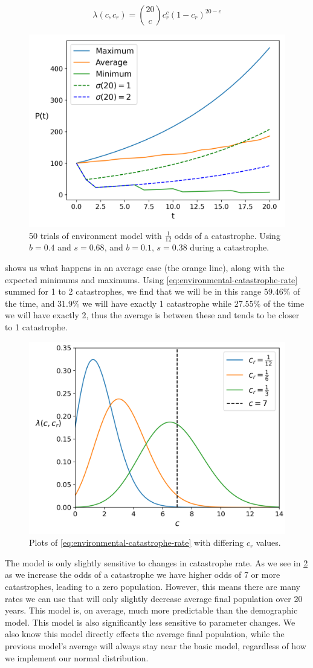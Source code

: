 \documentclass{article}
\begin{document}
\begin{equation} \label{eq:environmental-catastrophe-rate}
    \lambda(c, c_r) = \binom{20}{c} c_r^c (1-c_r)^{20-c}
\end{equation}

\begin{figure}[h!]
    \centering
    \includegraphics[width=.5\linewidth]{plots/environmental.png}
    \caption{50 trials of environment model with $\frac{1}{12}$ odds of a catastrophe. Using $b = 0.4$ and $s = 0.68$, and $b = 0.1$, $s = 0.38$ during a catastrophe.}
    \label{fig:environmental}
\end{figure}

 shows us what happens in an average case (the orange line), along with the expected minimums and maximums. Using \cref{eq:environmental-catastrophe-rate} summed for 1 to 2 catastrophes, we find that we will be in this range $59.46\%$ of the time, and $31.9\%$ we will have exactly 1 catastrophe while $27.55\%$ of the time we will have exactly 2, thus the average is between these and tends to be closer to 1 catastrophe.

\begin{figure}[h!]
    \centering
    \includegraphics[width=.5\linewidth]{plots/catastrophe_rate.png}
    \caption{Plots of \cref{eq:environmental-catastrophe-rate} with differing $c_r$ values.}
    \label{fig:environmental-catastrophe-rate}
\end{figure}

The model is only slightly sensitive to changes in catastrophe rate. As we see in \cref{fig:environmental-catastrophe-rate} as we increase the odds of a catastrophe we have higher odds of 7 or more catastrophes, leading to a zero population. However, this means there are many rates we can use that will only slightly decrease average final population over 20 years. This model is, on average, much more predictable than the demographic model. This model is also significantly less sensitive to parameter changes. We also know this model directly effects the average final population, while the previous model's average will always stay near the basic model, regardless of how we implement our normal distribution.
\end{document}

